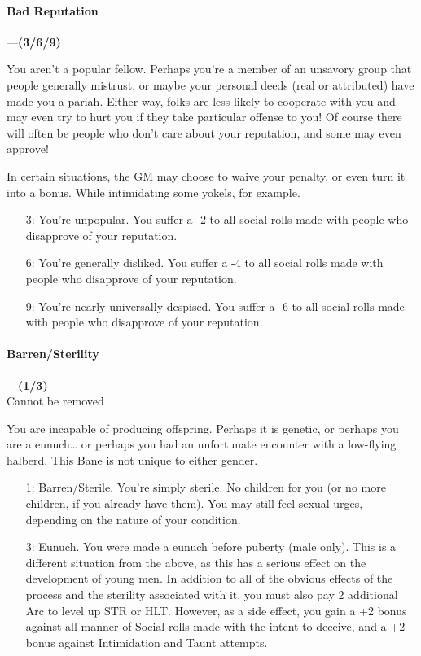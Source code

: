 \documentclass[oneside,11pt,english]{book}
\begin{document}
\paragraph{\label{bane:Bad Reputation}Bad Reputation}---\quad\textbf{(3/6/9) }\par
You aren't a popular fellow. Perhaps you're a member of an unsavory group that people generally 
mistrust, or maybe your personal deeds (real or attributed) have made you a pariah. Either way, folks are less likely to cooperate with you and may even try to hurt you if they take particular offense to you! Of 
course there will often be people who don't care about your reputation, and some may even approve! 


In certain situations, the GM may choose to waive your penalty, or even turn it into a bonus. While 
intimidating some yokels, for example. 

\begin{itemize}
	\item [3:] You're unpopular. You suffer a -2 to all social rolls made with people who disapprove of your 
	reputation. 
	\item [6:] You're generally disliked. You suffer a -4 to all social rolls made with people who disapprove of your 
	reputation. 
	\item [9:] You're nearly universally despised. You suffer a -6 to all social rolls made with people who disapprove 
of your reputation. 
\end{itemize}
\paragraph{\label{bane:Barren/Sterility}Barren/Sterility}---\quad\textbf{(1/3)}\\
{Cannot be removed}\par
You are incapable of producing offspring. Perhaps it is genetic, or perhaps you are a eunuch… or perhaps 
you had an unfortunate encounter with a low-flying halberd. This Bane is not unique to either gender. 
\begin{itemize}
\item [1:] Barren/Sterile. You’re simply sterile. No children for you (or no more children, if you already have them). You may still feel sexual urges, depending on the nature of your condition.
\item [3:] Eunuch. You were made a eunuch before puberty (male only). This is a different situation from the above, as this has a serious effect on the development of young men. In addition to all of the obvious effects of the process and the sterility associated with it, you must also pay 2 additional Arc to level up STR or HLT. However, as a side effect, you gain a +2 bonus against all manner of Social rolls made with the intent to deceive, and a +2 bonus against Intimidation and Taunt attempts.
\end{itemize}
\end{document}
